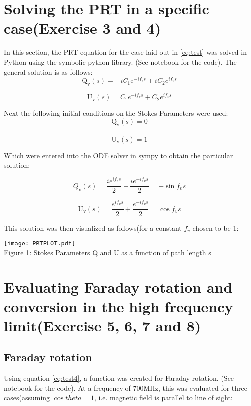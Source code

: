 \documentclass[apj]{emulateapj}
\begin{document}
\section{Solving the PRT in a specific case(Exercise 3 and 4)}
In this section, the PRT equation for the case laid out in \eqref{eq:test} was solved in Python using the symbolic python library. (See  notebook for the code). The general solution is as follows:
\begin{equation}
\mathrm{Q}_{\mathrm{v}}(s)=-i C_1 e^{-i f_v s}+i C_2 e^{i f_v s}
\end{equation}

\begin{equation}
\mathrm{U}_{\mathrm{v}}(s)=C_1 e^{-i f_v s}+C_2 e^{i f_v s}
\end{equation}


Next the following initial conditions on the Stokes Parameters were used: 
$$
\mathrm{Q}_{\mathrm{v}}(s)= 0
$$
\\   
$$
\mathrm{U}_{\mathrm{v}}(s)=1
$$

Which were entered into the ODE solver in sympy to obtain the particular solution:

\begin{equation}
Q_v(s)=\frac{i e^{i f_v s}}{2}-\frac{i e^{-i f_v s}}{2}= -\sin{f_{v}s}
\end{equation}

\begin{equation}
\mathrm{U}_{\mathrm{v}}(s)=\frac{e^{i f_v s}}{2}+\frac{e^{-i f_v s}}{2}= \cos{f_{v}s}
\end{equation}

This solution was then visualized as follows(for a constant $f_{v}$ chosen to be 1: 

\begin{center}
\texttt{[image: PRTPLOT.pdf]}\\
\label{plot 1}
Figure 1: Stokes Parameters Q and U as a function of path length s 
\end{center}


\section{Evaluating Faraday rotation and conversion in the high frequency limit(Exercise 5, 6, 7 and 8)}
\subsection{Faraday rotation}
Using equation \eqref{eq:test4}, a function was created  for Faraday rotation. (See notebook for the code). At a frequency of 700MHz, this was evaluated for three cases(assuming $\cos{theta}=1$, i.e. magnetic field is parallel to line of sight:
\end{document}
